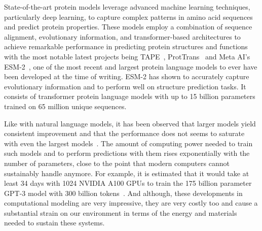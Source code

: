 State-of-the-art protein models leverage advanced machine learning techniques, particularly deep learning, to capture complex patterns in amino acid sequences and predict protein properties. These models employ a combination of sequence alignment, evolutionary information, and transformer-based architectures to achieve remarkable performance in predicting protein structures and functions with the most notable latest projects being TAPE~\cite{tape}, ProtTrans~\cite{prottrans} and Meta AI's ESM-2~\cite{esm2}, one of the most recent and largest protein language models to ever have been developed at the time of writing. ESM-2 has shown to accurately capture evolutionary information and to perform well on structure prediction tasks. It consists of transformer protein language models with up to 15 billion parameters trained on 65 million unique sequences.

Like with natural language models, it has been observed that larger models yield consistent improvement and that the performance does not seems to saturate with even the largest models~\cite{Ofer}. The amount of computing power needed to train such models and to perform predictions with them rises exponentially with the number of parameters, close to the point that modern computers cannot sustainably handle anymore. For example, it is estimated that it would take at least 34 days with 1024 NVIDIA A100 GPUs to train the 175 billion parameter GPT-3 model with 300 billion tokens~\cite{gptrain}. And although, these developments in computational modeling are very impressive, they are very costly too and cause a substantial strain on our environment in terms of the energy and materials needed to sustain these systems.